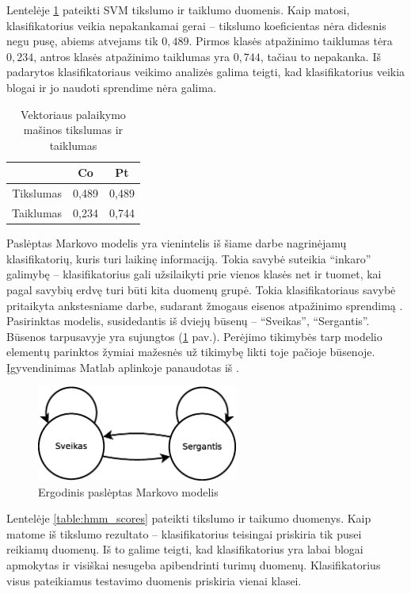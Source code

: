 \documentclass[]{vgtuef}
\begin{document}
Lentelėje \ref{table:svm_scores} pateikti SVM tikslumo ir taiklumo duomenis. Kaip matosi, klasifikatorius veikia nepakankamai gerai -- tikslumo koeficientas nėra didesnis negu pusę, abiems atvejams tik $0,489$. Pirmos klasės atpažinimo taiklumas tėra $0,234$, antros klasės atpažinimo taiklumas yra $0,744$, tačiau to nepakanka. Iš padarytos klasifikatoriaus veikimo analizės galima teigti, kad klasifikatorius veikia blogai ir jo naudoti sprendime nėra galima.

\begin{table}[!t]
  \centering
  \caption{Vektoriaus palaikymo mašinos tikslumas ir taiklumas}
  \label{table:svm_scores}
  \begin{tabular}{|c|c|c|} \hline
    & Co & Pt \\ \hline
    Tikslumas & 0,489 & 0,489 \\ \hline
    Taiklumas & 0,234 & 0,744 \\ \hline
  \end{tabular}
\end{table}

Paslėptas Markovo modelis \cite{18626} yra vienintelis iš šiame darbe nagrinėjamų klasifikatorių, kuris turi laikinę informaciją. Tokia savybė suteikia ``inkaro'' galimybę -- klasifikatorius gali užsilaikyti prie vienos klasės net ir tuomet, kai pagal savybių erdvę turi būti kita duomenų grupė. Tokia klasifikatoriaus savybė pritaikyta ankstesniame darbe, sudarant žmogaus eisenos atpažinimo sprendimą \cite{mano_darbas}. Pasirinktas modelis, susidedantis iš dviejų būsenų -- ``Sveikas'', ``Sergantis''. Būsenos tarpusavyje yra sujungtos (\ref{fig:hmm_model} pav.). Perėjimo tikimybės tarp modelio elementų parinktos žymiai mažesnės už tikimybę likti toje pačioje būsenoje. Įgyvendinimas Matlab aplinkoje panaudotas iš \cite{website:hmm_implementation}.

\begin{figure}
	\centering
	\includegraphics[width=250px]{figures/hmm_modelis}
	\caption{Ergodinis paslėptas Markovo modelis}
	\label{fig:hmm_model}
\end{figure}

Lentelėje \ref{table:hmm_scores} pateikti tikslumo ir taikumo duomenys. Kaip matome iš tikslumo rezultato -- klasifikatorius teisingai priskiria tik pusei reikiamų duomenų. Iš to galime teigti, kad klasifikatorius yra labai blogai apmokytas ir visiškai nesugeba apibendrinti turimų duomenų. Klasifikatorius visus pateikiamus testavimo duomenis priskiria vienai klasei.
\end{document}
